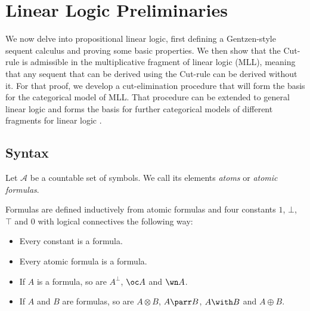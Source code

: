 \documentclass[DIN, pagenumber=false, fontsize=11pt, parskip=half, colorinlistoftodos, svgnames]{scrartcl}
\newcommand{\urgentnote}[2][]{\todo[color=red, #1]{#2}}
\begin{document}
	\fi 



	
	\section{Linear Logic Preliminaries}
	\label{sec: LinLogPre}
	
	We now delve into propositional linear logic, first defining a Gentzen-style sequent calculus and proving some basic properties.
	We then show that the Cut-rule is admissible in the multiplicative fragment of linear logic (MLL), meaning that any sequent that can be derived using the Cut-rule can be derived without it. 
	For that proof, we develop a cut-elimination procedure that will form the basis for the categorical model of MLL.
	That procedure can be extended to general linear logic \cite{brauner} and forms the basis for further categorical models of different fragments for linear logic \cite{mellies}.
	
	\subsection{Syntax}
	
	
	\begin{definition}
		Let $\mathcal{A}$ be a countable set of symbols. We call its elements \emph{atoms} or \emph{atomic formulas}. 
	\end{definition}
	
	\begin{definition}[Formula]
		Formulas are defined inductively from atomic formulas and four constants $1$, $\bot$, $\top$ and $0$ with logical  connectives the following way:
		\begin{itemize}
			\item Every constant is a formula.
			\item Every atomic formula is a formula.
			\item If $A$ is a formula, so are $A^\bot$,  $\oc A$ and $\wn A$.
			\item If $A$ and $B$ are formulas, so are $A \otimes B$, $A \parr B$, $A \with B$ and $A \oplus B$.
		\end{itemize}
	\end{definition}
	
\end{document}
